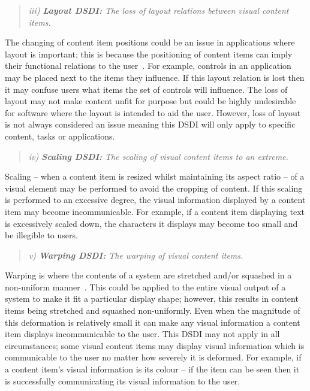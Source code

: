\documentclass[twocolumn,compsoc]{cvm}
\begin{document}
\begin{quote}\emph{iii) \textbf{Layout \ac{DSDI}:} The loss of layout relations between visual content items.}\end{quote}

The changing of content item positions could be an issue in applications where layout is important; this is because the positioning of content items can imply their functional relations to the user~\cite{Constantine1999,mcnaughton-et-al:hcis2017}.
For example, controls in an application may be placed next to the items they influence.
If this layout relation is lost then it may confuse users what items the set of controls will influence. 
The loss of layout may not make content unfit for purpose but could be highly undesirable for software where the layout is intended to aid the user.
However, loss of layout is not always considered an issue meaning this \ac{DSDI} will only apply to specific content, tasks or applications.

\begin{quote}\emph{iv) \textbf{Scaling \ac{DSDI}:} The scaling of visual content items to an extreme.}\end{quote}

Scaling -- when a content item is resized whilst maintaining its aspect ratio -- of a visual element may be performed to avoid the cropping of content.
If this scaling is performed to an excessive degree, the visual information displayed by a content item may become incommunicable.
For example, if a content item displaying text is excessively scaled down, the characters it displays may become too small and be illegible to users.

\begin{quote}\emph{v) \textbf{Warping \ac{DSDI}:} The warping of visual content items.}\end{quote}

Warping is where the contents of a system are stretched and/or squashed in a non-uniform manner~\cite{Milliron2002}.
This could be applied to the entire visual output of a system to make it fit a particular display shape; however, this results in content items being stretched and squashed non-uniformly.
Even when the magnitude of this deformation is relatively small it can make any visual information a content item displays incommunicable to the user.
This \ac{DSDI} may not apply in all circumstances; some visual content items may display visual information which is communicable to the user no matter how severely it is deformed.
For example, if a content item's visual information is its colour -- if the item can be seen then it is successfully communicating its visual information to the user.
\end{document}
